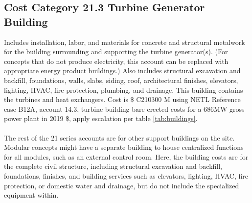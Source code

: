 \subsection*{Cost Category 21.3 Turbine Generator Building}
Includes installation, labor, and materials for concrete and structural metalwork for the building surrounding and supporting the turbine generator(s). (For concepts that do not produce electricity, this account can be replaced with appropriate energy product buildings.) Also includes structural excavation and backfill, foundations, walls, slabs, siding, roof, architectural finishes, elevators, lighting, HVAC, fire protection, plumbing, and drainage.  This building contains the turbines and heat exchangers. Cost is \$ C210300 M using NETL Reference case B12A, account 14.3, turbine building bare erected costs for a 686MW gross power plant in 2019 \$, apply escalation per table \ref{tab:buildings}.

\paragraph{}
The rest of the 21 series accounts are for other support buildings on the site. Modular concepts might have a separate building to house centralized functions for all modules, such as an external control room. Here, the building costs are for the complete civil structure, including structural excavation and backfill, foundations, finishes, and building services such as elevators, lighting, HVAC, fire protection, or domestic water and drainage, but do not include the specialized equipment within.

